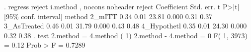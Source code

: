 . regress reject i.method , nocons noheader
       reject {\VBAR} Coefficient  Std. err.      t    P>|t|     [95\% conf. interval]
       method {\VBAR}
      2_mITT  {\VBAR}       0.34       0.01    23.81   0.000         0.31        0.37
 3_AsTreated  {\VBAR}       0.46       0.01    31.79   0.000         0.43        0.48
4_Hypothet{\tytilde}l  {\VBAR}       0.35       0.01    24.30   0.000         0.32        0.38
{\smallskip}
. test 2.method = 4.method
{\smallskip}
 ( 1)  2.method - 4.method = 0
{\smallskip}
       F(  1,  3973) =    0.12
            Prob > F =    0.7289
{\smallskip}
